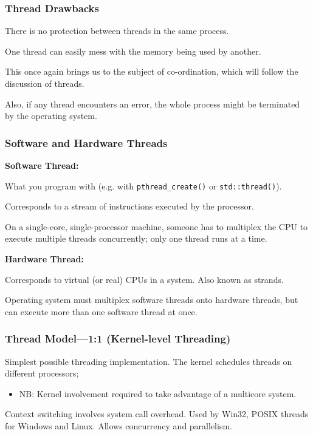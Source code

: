 \begin{frame}
\frametitle{Thread Drawbacks}

There is no protection between threads in the same process. 

One thread can easily mess with the memory being used by another. 

This once again brings us to the subject of co-ordination, which will follow the discussion of threads.

Also, if any thread encounters an error, the whole process might be terminated by the operating system.

\end{frame}
\begin{frame}
  \frametitle{Software and Hardware Threads}


  {\bf Software Thread:}

  What you program with (e.g. with {\tt pthread\_create()} or {\tt std::thread()}). \vfill

  Corresponds to a stream of instructions executed by the processor. \vfill

  On a single-core, single-processor machine, someone has to multiplex the CPU to
  execute multiple threads concurrently; only one thread runs at a time.

  \vfill
  {\bf Hardware Thread:}

  Corresponds to virtual (or real) CPUs in a system. Also known as strands. \vfill

  Operating system must multiplex software threads onto hardware threads, but 
  can execute more than one software thread at once.


\end{frame}

\begin{frame}
  \frametitle{Thread Model---1:1 (Kernel-level Threading)}


    Simplest possible threading implementation.
    \vfill
    The kernel schedules threads on different processors;
      \begin{itemize}
        \item NB: Kernel involvement required to take advantage of a multicore system.
      \end{itemize}
    \vfill
    Context switching involves system call overhead.
    \vfill
    Used by Win32, POSIX threads for Windows and Linux.
    \vfill
    Allows concurrency and parallelism.

\end{frame}

